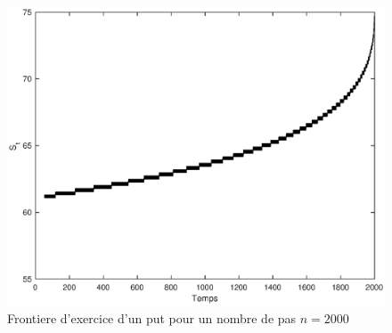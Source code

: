 \begin{figure}[H]
\centering
\includegraphics[scale=0.5]{./img/FRONTIERE_PUT_2000.eps}
\caption{Frontiere d'exercice d'un put pour un nombre de pas $n=2000$}
\label{fig:front_2000}
\end{figure}


